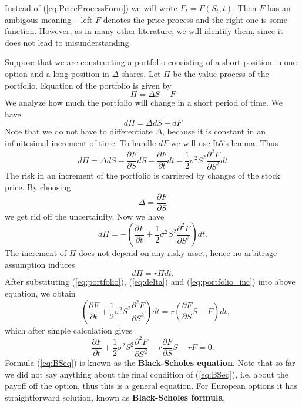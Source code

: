 \documentclass[a4paper,11pt, twoside]{book}
\theoremstyle{definition}
\theoremstyle{remark}
\begin{document}
Instead of (\ref{eq:PriceProcessForm}) we will write $F_t = F(S_t, t)$. Then $F$ has an ambigous meaning -- left $F$ denotes the price process and the right one is some function. However, as in many other literature, we will identify them, since it does not lead to misunderstanding.

Suppose that we are constructing a portfolio consisting of a short position in one option and a long position in $\Delta$ shares. Let $\Pi$ be the value process of the portfolio. Equation of the portfolio is given by
\begin{equation}
 \label{eq:portfolio}
  \Pi = \Delta S - F 
\end{equation}
We analyze how much the portfolio will change in a short period of time. We have
\[ d\Pi = \Delta dS - dF  \]
Note that we do not have to differentiate $\Delta$, because it is constant in an infinitesimal increment of time. To handle $dF$ we will use It\^{o}'s lemma. Thus
\[ d\Pi = \Delta dS - \frac{\partial F}{\partial S}dS - \frac{\partial F}{\partial t}dt - \frac{1}{2}\sigma^2 S^2 \frac{\partial^2 F}{\partial S^2}dt  \]
The risk in an increment of the portfolio is carriered by changes of the stock price. By choosing
\begin{equation}
 \label{eq:delta}
 \Delta = \frac{\partial F}{\partial S}
\end{equation}
we get rid off the uncertainity. Now we have
\begin{equation}
  \label{eq:portfolio_inc}
 d\Pi = -(\frac{\partial F}{\partial t} + \frac{1}{2}\sigma^2 S^2 \frac{\partial^2 F}{\partial S^2})dt.
\end{equation}
The increment of $\Pi$ does not depend on any risky asset, hence no-arbitrage assumption induces
\[ d\Pi = r\Pi dt. \]
After substituting (\ref{eq:portfolio}), (\ref{eq:delta}) and (\ref{eq:portfolio_inc}) into above equation, we obtain
\[ -(\frac{\partial F}{\partial t} + \frac{1}{2}\sigma^2 S^2 \frac{\partial^2 F}{\partial S^2})dt = r(\frac{\partial F}{\partial S} S - F)dt, \]
which after simple calculation gives
\begin{equation}
 \label{eq:BSeq}
 \frac{\partial F}{\partial t} + \frac{1}{2}\sigma^2 S^2 \frac{\partial^2 F}{\partial S^2} + r\frac{\partial F}{\partial S} S - rF = 0.
\end{equation}
Formula (\ref{eq:BSeq}) is known as the \textbf{Black-Scholes equation}. Note that so far we did not say anything about the final condition of (\ref{eq:BSeq}), i.e. about the payoff off the option, thus this is a general equation. For European options it has straightforward solution, known as \textbf{Black-Scholes formula}.
\end{document}
